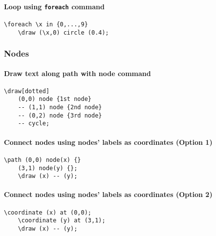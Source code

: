 \documentclass{article}
\begin{document}
\paragraph{Loop using \texttt{foreach} command}
\begin{Verbatim}[fontsize=\scriptsize]
    \foreach \x in {0,...,9}
    \draw (\x,0) circle (0.4);
\end{Verbatim}

\subsubsection{Nodes}
\paragraph{Draw text along path with node command}
\begin{Verbatim}[fontsize=\scriptsize]
    \draw[dotted]
    (0,0) node {1st node}
    -- (1,1) node {2nd node}
    -- (0,2) node {3rd node}
    -- cycle;
\end{Verbatim}

\paragraph{Connect nodes using nodes' labels as coordinates (Option 1)}
\begin{Verbatim}[fontsize=\scriptsize]
    \path (0,0) node(x) {}
    (3,1) node(y) {};
    \draw (x) -- (y);
\end{Verbatim}

\paragraph{Connect nodes using nodes' labels as coordinates (Option 2)}
\begin{Verbatim}[fontsize=\scriptsize]
    \coordinate (x) at (0,0);
    \coordinate (y) at (3,1);
    \draw (x) -- (y);
\end{Verbatim}
\end{document}
